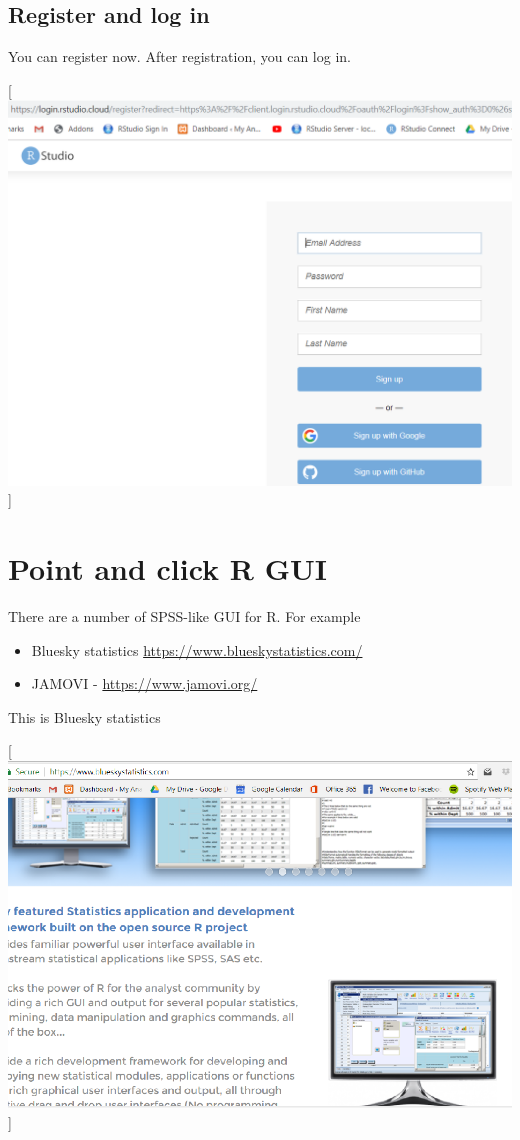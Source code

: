 \documentclass[
]{book}
\providecommand{\tightlist}{%
  \setlength{\itemsep}{0pt}\setlength{\parskip}{0pt}}
\begin{document}
\hypertarget{register-and-log-in}{%
\subsection{Register and log in}\label{register-and-log-in}}

You can register now. After registration, you can log in.

{[}\includegraphics{cloud2.PNG}{]}

\hypertarget{point-and-click-r-gui}{%
\section{Point and click R GUI}\label{point-and-click-r-gui}}

There are a number of SPSS-like GUI for R. For example

\begin{itemize}
\tightlist
\item
  Bluesky statistics \url{https://www.blueskystatistics.com/}
\item
  JAMOVI - \url{https://www.jamovi.org/}
\end{itemize}

This is Bluesky statistics

{[}\includegraphics{bluesky.PNG}{]}
\end{document}
